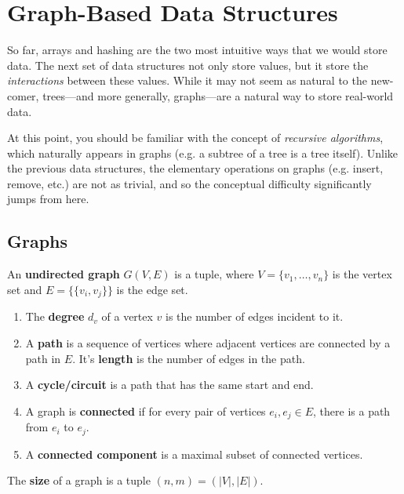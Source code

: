 \section{Graph-Based Data Structures} 

  So far, arrays and hashing are the two most intuitive ways that we would store data. The next set of data structures not only store values, but it store the \textit{interactions} between these values. While it may not seem as natural to the new-comer, trees---and more generally, graphs---are a natural way to store real-world data. 

  At this point, you should be familiar with the concept of \textit{recursive algorithms}, which naturally appears in graphs (e.g. a subtree of a tree is a tree itself). Unlike the previous data structures, the elementary operations on graphs (e.g. insert, remove, etc.) are not as trivial, and so the conceptual difficulty significantly jumps from here.  

\subsection{Graphs}

  \begin{definition}
    An \textbf{undirected graph} $G(V, E)$ is a tuple, where $V = \{v_1, \ldots, v_n\}$ is the vertex set and $E = \{\{v_i, v_j\}\}$ is the edge set. 
    \begin{enumerate}
      \item The \textbf{degree} $d_v$ of a vertex $v$ is the number of edges incident to it. 
      \item A \textbf{path} is a sequence of vertices where adjacent vertices are connected by a path in $E$. It's \textbf{length} is the number of edges in the path. 
      \item A \textbf{cycle/circuit} is a path that has the same start and end. 
      \item A graph is \textbf{connected} if for every pair of vertices $e_i, e_j \in E$, there is a path from $e_i$ to $e_j$. 
      \item A \textbf{connected component} is a maximal subset of connected vertices. 
    \end{enumerate}
    The \textbf{size} of a graph is a tuple $(n, m) = (|V|, |E|)$. 
  \end{definition}

